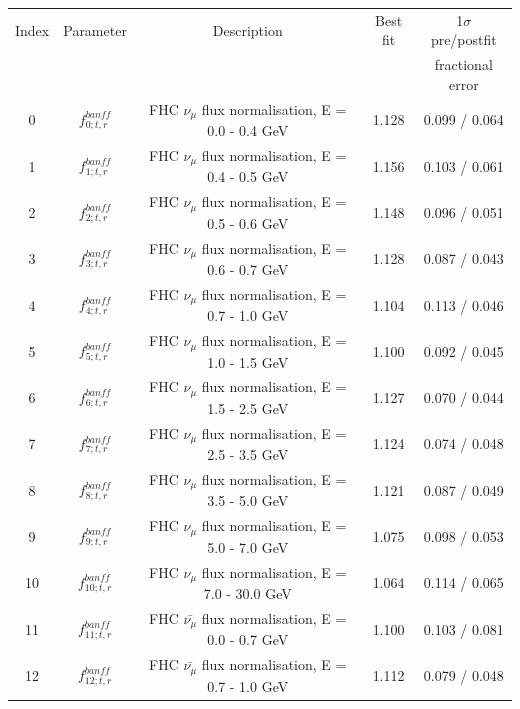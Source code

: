 {
\renewcommand{\arraystretch}{1.2}



\begin{table}
\centering
\begin{tabular}{| c | c | c | c | c |}
\hline
         Index & Parameter & Description & Best fit & 1$\sigma$ pre/postfit \\
          & & & & fractional error \\
\hline

0     &$f_{0; t, r}^{banff}$      & FHC $\nu_\mu$ flux normalisation, E = 0.0 - 0.4 GeV         & 1.128   & 0.099 / 0.064 \\ 
1     &$f_{1; t, r}^{banff}$     & FHC $\nu_\mu$ flux normalisation, E = 0.4 - 0.5 GeV         & 1.156   & 0.103 / 0.061 \\ 
2     & $f_{2; t, r}^{banff}$      & FHC $\nu_\mu$ flux normalisation, E = 0.5 - 0.6 GeV         & 1.148   & 0.096 / 0.051 \\ 
3      &$f_{3; t, r}^{banff}$     & FHC $\nu_\mu$ flux normalisation, E = 0.6 - 0.7 GeV         & 1.128   & 0.087 / 0.043 \\ 
4      &$f_{4; t, r}^{banff}$     & FHC $\nu_\mu$ flux normalisation, E = 0.7 - 1.0 GeV         & 1.104   & 0.113 / 0.046 \\ 
5      & $f_{5; t, r}^{banff}$     & FHC $\nu_\mu$ flux normalisation, E = 1.0 - 1.5 GeV         & 1.100   & 0.092 / 0.045 \\ 
6      &$f_{6; t, r}^{banff}$     & FHC $\nu_\mu$ flux normalisation, E = 1.5 - 2.5 GeV         & 1.127   & 0.070 / 0.044 \\ 
7      &$f_{7; t, r}^{banff}$     & FHC $\nu_\mu$ flux normalisation, E = 2.5 - 3.5 GeV         & 1.124   & 0.074 / 0.048 \\ 
8      &$f_{8; t, r}^{banff}$     & FHC $\nu_\mu$ flux normalisation, E = 3.5 - 5.0 GeV         & 1.121   & 0.087 / 0.049 \\ 
9      &$f_{9; t, r}^{banff}$     & FHC $\nu_\mu$ flux normalisation, E = 5.0 - 7.0 GeV         & 1.075   & 0.098 / 0.053 \\ 
10    &$f_{10; t, r}^{banff}$      & FHC $\nu_\mu$ flux normalisation, E = 7.0 - 30.0 GeV        & 1.064   & 0.114 / 0.065 \\ 
11     &$f_{11; t, r}^{banff}$     & FHC $\bar{\nu_\mu}$ flux normalisation, E = 0.0 - 0.7 GeV   & 1.100   & 0.103 / 0.081 \\ 
12     &$f_{12; t, r}^{banff}$     & FHC $\bar{\nu_\mu}$ flux normalisation, E = 0.7 - 1.0 GeV   & 1.112   & 0.079 / 0.048 \\ 

\end{tabular}
\end{table}}
